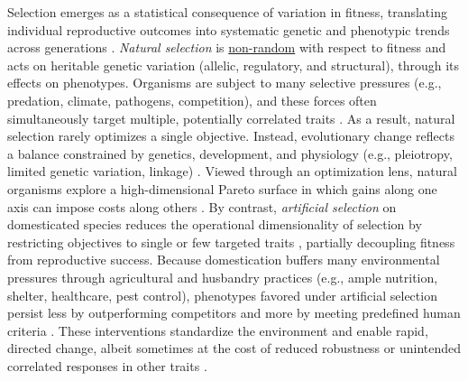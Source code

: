 Selection emerges as a statistical consequence of variation in fitness, translating individual reproductive outcomes into systematic genetic and phenotypic trends across generations \citep{gregory2009understanding, endler1986natural}.
\textit{Natural selection} is \underline{non-random} with respect to fitness and acts on heritable genetic variation (allelic, regulatory, and structural), through its effects on phenotypes.
Organisms are subject to many selective pressures (e.g., predation, climate, pathogens, competition), and these forces often simultaneously target multiple, potentially correlated traits \citep{lande1983measurement}.
As a result, natural selection rarely optimizes a single objective.
Instead, evolutionary change reflects a balance constrained by genetics, development, and physiology (e.g., pleiotropy, limited genetic variation, linkage) \citep{garland2022trade}.
Viewed through an optimization lens, natural organisms explore a high-dimensional Pareto surface in which gains along one axis can impose costs along others \citep{shoval2012evolutionary}.
By contrast, \textit{artificial selection} on domesticated species reduces the operational dimensionality of selection by restricting objectives to single or few targeted traits \citep{hill1992artificial}, partially decoupling fitness from reproductive success.
Because domestication buffers many environmental pressures through agricultural and husbandry practices (e.g., ample nutrition, shelter, healthcare, pest control), phenotypes favored under artificial selection persist less by outperforming competitors and more by meeting predefined human criteria \citep{milla2015plant,ahmad2020domestication}.
These interventions standardize the environment and enable rapid, directed change, albeit sometimes at the cost of reduced robustness or unintended correlated responses in other traits \citep{frankham2008genetic}.
%


